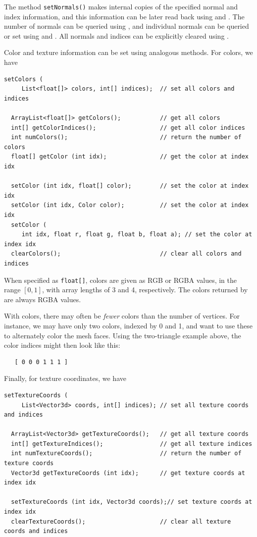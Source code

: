 The method {\tt setNormals()} makes internal copies of the specified
normal and index information, and this information can be
later read back using 
and
.
The number of normals can be queried using
,
and individual normals can be queried or set using
and
.
All normals and indices can be explicitly cleared using 
.

Color and texture information can be set using analogous methods.
For colors, we have
%
\begin{lstlisting}[]
  setColors (
     List<float[]> colors, int[] indices);  // set all colors and indices

  ArrayList<float[]> getColors();           // get all colors
  int[] getColorIndices();                  // get all color indices
  int numColors();                          // return the number of colors
  float[] getColor (int idx);               // get the color at index idx

  setColor (int idx, float[] color);        // set the color at index idx
  setColor (int idx, Color color);          // set the color at index idx
  setColor (
     int idx, float r, float g, float b, float a); // set the color at index idx
  clearColors();                            // clear all colors and indices
\end{lstlisting}
%
When specified as {\tt float[]}, colors are given as RGB or
RGBA values, in the range $[0,1]$, with array lengths of 3 and 4,
respectively.  The colors returned by
 are always RGBA
values.

%
With colors, there may often be {\it fewer} colors than the number of
vertices. For instance, we may have only two colors, indexed by 0 and
1, and want to use these to alternately color the mesh faces. Using
the two-triangle example above, the color indices might then look like
this:
%
\begin{verbatim}
   [ 0 0 0 1 1 1 ]
\end{verbatim}
%

Finally, for texture coordinates, we have
%
\begin{lstlisting}[]
  setTextureCoords (
     List<Vector3d> coords, int[] indices); // set all texture coords and indices

  ArrayList<Vector3d> getTextureCoords();   // get all texture coords
  int[] getTextureIndices();                // get all texture indices
  int numTextureCoords();                   // return the number of texture coords
  Vector3d getTextureCoords (int idx);      // get texture coords at index idx

  setTextureCoords (int idx, Vector3d coords);// set texture coords at index idx
  clearTextureCoords();                     // clear all texture coords and indices
\end{lstlisting}

